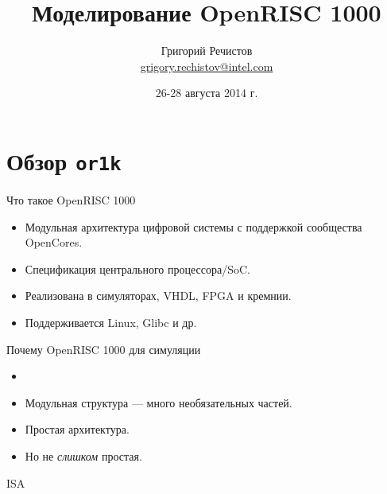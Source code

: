 \documentclass{beamer}
\title{Моделирование OpenRISC 1000}
\author[Григорий Речистов]{Григорий Речистов \\ \small{\href{mailto:grigory.rechistov@intel.com}{grigory.rechistov@intel.com}}}
\date{26-28 августа 2014 г.}
\begin{document}
\begin{frame}
\titlepage
\end{frame}

\begin{frame}
\tableofcontents
\end{frame} 


\section{Обзор \texttt{or1k}}

\begin{frame}{Что такое OpenRISC 1000}

\begin{itemize}
	\item Модульная архитектура цифровой системы с поддержкой сообщества OpenCores.
	\item Спецификация центрального процессора/SoC.
	\item Реализована в симуляторах, VHDL, FPGA и кремнии.
	\item Поддерживается Linux, Glibc и др.
\end{itemize}

\end{frame}

\begin{frame}{Почему OpenRISC 1000 для симуляции}
\begin{itemize}\pause
\item{}
\item<4-> Модульная структура — много необязательных частей.
\item<4-> Простая архитектура.
\item<5-> Но не \textit{слишком} простая.
\end{itemize}
\end{frame}

\begin{frame}{ISA}
\centering
{}

\end{frame}
\end{document}
